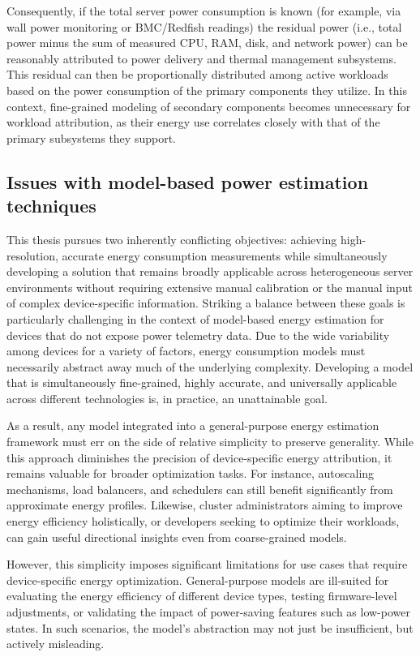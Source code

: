 Consequently, if the total server power consumption is known (for example, via wall power monitoring or BMC/Redfish readings) the residual power (i.e., total power minus the sum of measured CPU, RAM, disk, and network power) can be reasonably attributed to power delivery and thermal management subsystems. This residual can then be proportionally distributed among active workloads based on the power consumption of the primary components they utilize. In this context, fine-grained modeling of secondary components becomes unnecessary for workload attribution, as their energy use correlates closely with that of the primary subsystems they support.

\subsection{Issues with model-based power estimation techniques}
This thesis pursues two inherently conflicting objectives: achieving high-resolution, accurate energy consumption measurements while simultaneously developing a solution that remains broadly applicable across heterogeneous server environments without requiring extensive manual calibration or the manual input of complex device-specific information. Striking a balance between these goals is particularly challenging in the context of model-based energy estimation for devices that do not expose power telemetry data. Due to the wide variability among devices for a variety of factors, energy consumption models must necessarily abstract away much of the underlying complexity. Developing a model that is simultaneously fine-grained, highly accurate, and universally applicable across different technologies is, in practice, an unattainable goal.

As a result, any model integrated into a general-purpose energy estimation framework must err on the side of relative simplicity to preserve generality. While this approach diminishes the precision of device-specific energy attribution, it remains valuable for broader optimization tasks. For instance, autoscaling mechanisms, load balancers, and schedulers can still benefit significantly from approximate energy profiles. Likewise, cluster administrators aiming to improve energy efficiency holistically, or developers seeking to optimize their workloads, can gain useful directional insights even from coarse-grained models.

However, this simplicity imposes significant limitations for use cases that require device-specific energy optimization. General-purpose models are ill-suited for evaluating the energy efficiency of different device types, testing firmware-level adjustments, or validating the impact of power-saving features such as low-power states. In such scenarios, the model’s abstraction may not just be insufficient, but actively misleading.

